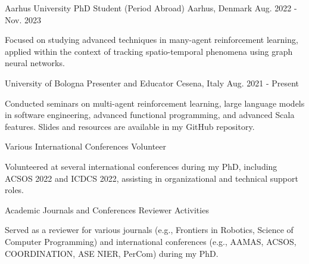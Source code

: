 
\begin{cventries}

  \cventry
    {Aarhus University} %
    {PhD Student (Period Abroad)} %
    {Aarhus, Denmark} %
    {Aug. 2022 - Nov. 2023} %
    {
      \begin{cvitems} %
        \item {Focused on studying advanced techniques in many-agent reinforcement learning, applied within the context of tracking spatio-temporal phenomena using graph neural networks.}
      \end{cvitems}
    }
  \cventry
    {University of Bologna} %
    {Presenter and Educator} %
    {Cesena, Italy} %
    {Aug. 2021 - Present} %
    {
      \begin{cvitems} %
        \item {Conducted seminars on multi-agent reinforcement learning, large language models in software engineering, advanced functional programming, and advanced Scala features. Slides and resources are available in my GitHub repository.\\[-0.1cm]}
      \end{cvitems}
    }
  \cventry
    {Various International Conferences} %
    {Volunteer} %
    {} %
    {} %
    {
      \begin{cvitems} %
        \item {Volunteered at several international conferences during my PhD, including ACSOS 2022 and ICDCS 2022, assisting in organizational and technical support roles.\\[-0.1cm]}
      \end{cvitems}
    }
  \cventry
    {Academic Journals and Conferences} %
    {Reviewer Activities} %
    {} %
    {} %
    {
      \begin{cvitems} %
        \item {Served as a reviewer for various journals (e.g., Frontiers in Robotics, Science of Computer Programming) and international conferences (e.g., AAMAS, ACSOS, COORDINATION, ASE NIER, PerCom) during my PhD.}
      \end{cvitems}
    }
\end{cventries}
